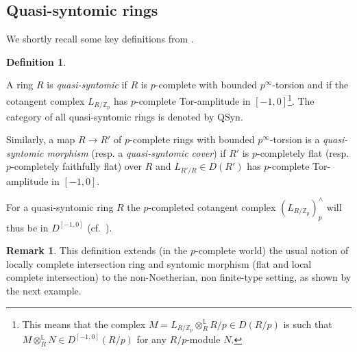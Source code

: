 \documentclass{amsart}
\theoremstyle{plain}
\theoremstyle{definition}
\newtheorem{definition}[theorem]{Definition}
\newtheorem{remark}[theorem]{Remark}
\newcommand{\Z}{\mathbb{Z}}
\newcommand{\zp}{\mathbb{Z}_p}
\begin{document}



\subsection{Quasi-syntomic rings}
\label{sec:quasi-syn-rings}

We shortly recall some key definitions from \cite[Chapter 4]{bhatt_morrow_scholze_topological_hochschild_homology}.

\begin{definition}
\label{sec:quasi-syn-rings-definition-quasi-syn-rings}

A ring $R$ is \textit{quasi-syntomic} if $R$ is $p$-complete with bounded
$p^{\infty}$-torsion and if the cotangent complex $L_{R/\zp}$ has $p$-complete
Tor-amplitude in $[-1,0]$\footnote{This means that the complex $M=L_{R/\zp}
\otimes_R^{\mathbb{L}} R/p \in D(R/p)$ is such that $M \otimes_R^{\mathbb{L}} N \in
D^{[-1,0]}(R/p)$ for any $R/p$-module $N$.}. The category of all quasi-syntomic
rings is denoted by $\mathrm{QSyn}$. 

Similarly, a map $R \to R'$ of $p$-complete rings with bounded $p^{\infty}$-torsion
is a \textit{quasi-syntomic morphism} (resp. a \textit{quasi-syntomic cover}) if
$R'$ is $p$-completely flat (resp. $p$-completely faithfully flat) over $R$ and
$L_{R'/R} \in D(R')$ has $p$-complete Tor-amplitude in $[-1,0]$. 
\end{definition}

  For a quasi-syntomic ring $R$ the $p$-completed cotangent complex $(L_{R/\Z_p})^{\wedge}_p$ will thus be in $D^{[-1,0]}$ (cf.\ \cite[Lemma 4.6]{bhatt_morrow_scholze_topological_hochschild_homology}).


\begin{remark}
  \label{sec:quasi-syntomic-rings-remark-quasi-syntomic-generalizes-lci}
This definition extends (in the $p$-complete world) the usual notion of locally complete intersection
ring and syntomic morphism (flat and local complete intersection) to the
non-Noetherian, non finite-type setting, as shown by the next example. 
\end{remark}
\end{document}
